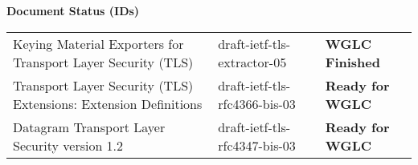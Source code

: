 \documentclass[helvetica]{seminar}
\newcommand{\heading}[1]{%
  \begin{center} 
    \large\bf 
    #1 
  \end{center} 
  \vspace{.4 in}}
\begin{document}
\begin{slide}
\heading{Document Status (IDs)}

{\tiny
\begin{tabular}{|p{1.5 in}|p{1.4 in}|p{.7 in}|}
\hline
Keying Material Exporters for Transport Layer Security (TLS) & draft-ietf-tls-extractor-05 & \textbf{WGLC Finished} \\
Transport Layer Security (TLS) Extensions: Extension Definitions & draft-ietf-tls-rfc4366-bis-03 & \textbf{Ready for WGLC} \\
Datagram Transport Layer Security version 1.2 & draft-ietf-tls-rfc4347-bis-03 & \textbf{Ready for WGLC} \\
\hline
\end{tabular}
}


\end{slide}
\end{document}
